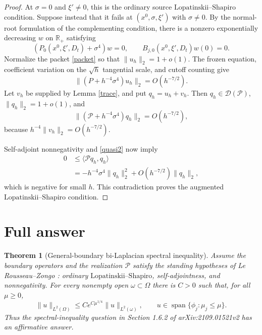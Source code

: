 \documentclass[11pt]{article}
\newtheorem{theorem}{Theorem}
\newcommand{\Om}{\Omega}
\newcommand{\LS}{\text{Lopatinskii--Shapiro}}
\newcommand{\Span}{\operatorname{span}}
\newcommand{\cD}{\mathcal D}
\begin{document}
\begin{proof}
At $\sigma=0$ and $\xi'\ne0$, this is the ordinary source $\LS$ condition.
Suppose instead that it fails at $(x^0,\sigma,\xi')$ with $\sigma\ne0$.
By the normal-root formulation of the complementing condition, there is a
nonzero exponentially decreasing $w$ on $\mathbb R_+$ satisfying
\begin{equation}\label{normalmode}
 (P_0(x^0,\xi',D_t)+\sigma^4)w=0,\qquad
 B_{j,0}(x^0,\xi',D_t)w(0)=0.
\end{equation}
Normalize the packet \eqref{packet} so that $\|u_h\|_2=1+o(1)$. The frozen
equation, coefficient variation on the $\sqrt h$ tangential scale, and cutoff
counting give
\begin{equation}\label{quasi1}
 \|(P+h^{-4}\sigma^4)u_h\|_2=O(h^{-7/2}).
\end{equation}
Let $v_h$ be supplied by Lemma \ref{trace}, and put $q_h=u_h+v_h$. Then
$q_h\in\cD(\mathcal P)$, $\|q_h\|_2=1+o(1)$, and
\begin{equation}\label{quasi2}
 \|(\mathcal P+h^{-4}\sigma^4)q_h\|_2=O(h^{-7/2}),
\end{equation}
because $h^{-4}\|v_h\|_2=O(h^{-7/2})$.

Self-adjoint nonnegativity and \eqref{quasi2} now imply
\begin{align*}
 0&\le \langle\mathcal Pq_h,q_h\rangle\\
 &=-h^{-4}\sigma^4\|q_h\|_2^2
   +O(h^{-7/2})\|q_h\|_2,
\end{align*}
which is negative for small $h$. This contradiction proves the augmented
$\LS$ condition.
\end{proof}

\section{Full answer}

\begin{theorem}[General-boundary bi-Laplacian spectral inequality]\label{main}
Assume the boundary operators and the realization $\mathcal P$ satisfy the
standing hypotheses of Le Rousseau--Zongo \cite{source}: ordinary $\LS$,
self-adjointness, and nonnegativity. For every nonempty open
$\omega\subset\Om$ there is $C>0$ such that, for all $\mu\ge0$,
\[
 \|u\|_{L^2(\Om)}\le C e^{C\mu^{1/4}}\|u\|_{L^2(\omega)},
 \qquad u\in\Span\{\phi_j:\mu_j\le\mu\}.
\]
Thus the spectral-inequality question in Section 1.6.2 of
arXiv:2109.01521v2 has an affirmative answer.
\end{theorem}
\end{document}
